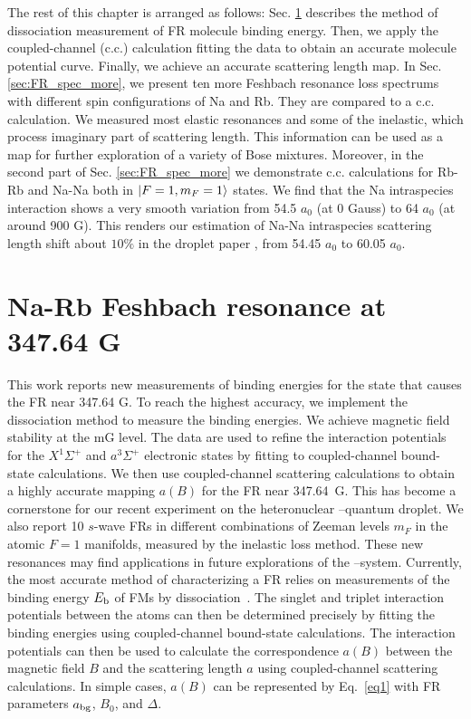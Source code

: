 The rest of this chapter is arranged as follows: Sec. \ref{sec:cali_FR} describes the method of dissociation measurement of FR molecule binding energy. Then, we apply the coupled-channel (c.c.) calculation fitting the data to obtain an accurate molecule potential curve. Finally, we achieve an accurate scattering length map. In Sec. \ref{sec:FR_spec_more}, we present ten more Feshbach resonance loss spectrums with different spin configurations of Na and Rb. They are compared to a c.c. calculation. We measured most elastic resonances and some of the inelastic, which process imaginary part of scattering length. This information can be used as a map for further exploration of a variety of Bose mixtures. Moreover, in the second part of Sec. \ref{sec:FR_spec_more} we demonstrate c.c. calculations for Rb-Rb and Na-Na both in $\ket{F=1,m_F=1}$ states. We find that the Na intraspecies interaction shows a very smooth variation from 54.5 $a_0$ (at 0 Gauss) to 64 $a_0$ (at around 900 G). This renders our estimation of Na-Na intraspecies scattering length shift about $10\%$ in the droplet paper \cite{guo2021leehuangyang}, from 54.45 $a_0$ to 60.05 $a_0$.

\section{Na-Rb Feshbach resonance at 347.64 G}
\label{sec:cali_FR}

This work reports new measurements of binding energies for the state that causes the FR near 347.64 G.
To reach the highest accuracy, we implement the dissociation method to measure the binding energies. We achieve magnetic field stability at the mG level. The data are used to refine the interaction potentials for the $X^1\Sigma^+$ and $a^3\Sigma^+$ electronic states by fitting to coupled-channel bound-state calculations. We then use coupled-channel scattering calculations to obtain a highly accurate mapping $a(B)$ for the FR near 347.64~G. This has become a cornerstone for our recent experiment on the heteronuclear \Na--\Rb quantum droplet. We also report 10 $s$-wave FRs in different combinations of Zeeman levels $m_F$ in the atomic $F = 1$ manifolds, measured by the inelastic loss method. These new resonances may find applications in future explorations of the \Na--\Rb system.
Currently, the most accurate method of characterizing a FR relies on measurements of the binding energy $E_{\rm b}$ of FMs by dissociation~\cite{Bartenstein2005,Lompe2013,Chin2005Radio,Chapurin2019}. The singlet and triplet interaction potentials between the atoms can then be determined precisely by fitting the binding energies using coupled-channel bound-state calculations. The interaction potentials can then be used to calculate the correspondence $a(B)$ between the magnetic field $B$ and the scattering length $a$ using coupled-channel scattering calculations. In simple cases, $a(B)$ can be represented by Eq.~\ref{eq1} with FR parameters $a_{\rm bg}$, $B_0$, and $\Delta$.

